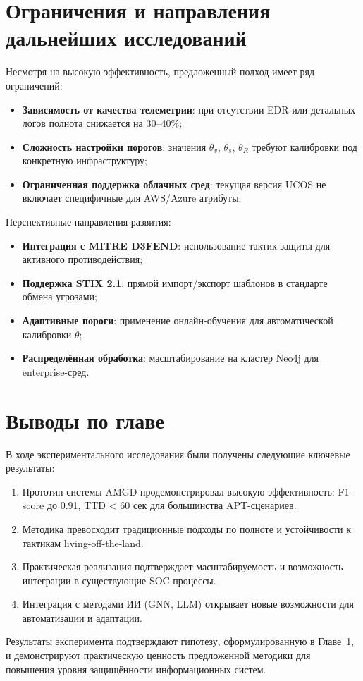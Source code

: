 \section{Ограничения и направления дальнейших исследований}\label{sec:ch4/sect7}

Несмотря на высокую эффективность, предложенный подход имеет ряд ограничений:

\begin{itemize}
    \item \textbf{Зависимость от качества телеметрии}: при отсутствии EDR или детальных логов полнота снижается на 30–40\%;
    \item \textbf{Сложность настройки порогов}: значения $\theta_v$, $\theta_s$, $\theta_R$ требуют калибровки под конкретную инфраструктуру;
    \item \textbf{Ограниченная поддержка облачных сред}: текущая версия UCOS не включает специфичные для AWS/Azure атрибуты.
\end{itemize}

Перспективные направления развития:

\begin{itemize}
    \item \textbf{Интеграция с MITRE D3FEND}: использование тактик защиты для активного противодействия;
    \item \textbf{Поддержка STIX 2.1}: прямой импорт/экспорт шаблонов в стандарте обмена угрозами;
    \item \textbf{Адаптивные пороги}: применение онлайн-обучения для автоматической калибровки $\theta$;
    \item \textbf{Распределённая обработка}: масштабирование на кластер Neo4j для enterprise-сред.
\end{itemize}

\section{Выводы по главе}\label{sec:ch4/conclusion}

В ходе экспериментального исследования были получены следующие ключевые результаты:
\begin{enumerate}
    \item Прототип системы AMGD продемонстрировал высокую эффективность: F1-score до 0.91, TTD < 60 сек для большинства APT-сценариев.
    \item Методика превосходит традиционные подходы по полноте и устойчивости к тактикам living-off-the-land.
    \item Практическая реализация подтверждает масштабируемость и возможность интеграции в существующие SOC-процессы.
    \item Интеграция с методами ИИ (GNN, LLM) открывает новые возможности для автоматизации и адаптации.
\end{enumerate}

Результаты эксперимента подтверждают гипотезу, сформулированную в Главе~1, и демонстрируют практическую ценность предложенной методики для повышения уровня защищённости информационных систем.
